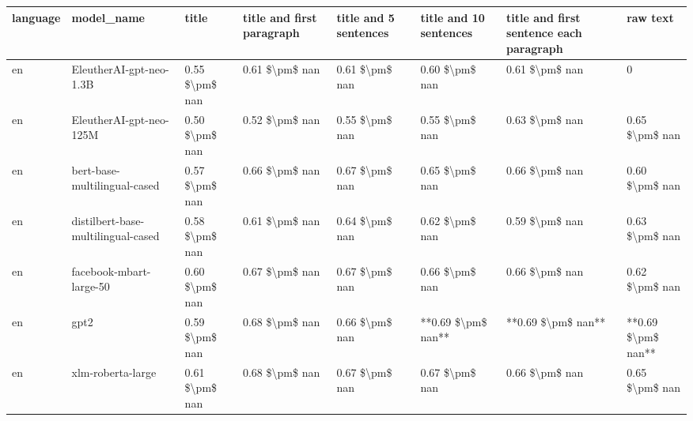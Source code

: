 \begin{tabular}{llllllll}
\toprule
language &                         model\_name &          title & title and first paragraph & title and 5 sentences & title and 10 sentences & title and first sentence each paragraph &           raw text \\
\midrule
      en &            EleutherAI-gpt-neo-1.3B & 0.55 \$\textbackslash pm\$ nan &            0.61 \$\textbackslash pm\$ nan &        0.61 \$\textbackslash pm\$ nan &         0.60 \$\textbackslash pm\$ nan &                          0.61 \$\textbackslash pm\$ nan &                  0 \\
      en &            EleutherAI-gpt-neo-125M & 0.50 \$\textbackslash pm\$ nan &            0.52 \$\textbackslash pm\$ nan &        0.55 \$\textbackslash pm\$ nan &         0.55 \$\textbackslash pm\$ nan &                          0.63 \$\textbackslash pm\$ nan &     0.65 \$\textbackslash pm\$ nan \\
      en &       bert-base-multilingual-cased & 0.57 \$\textbackslash pm\$ nan &            0.66 \$\textbackslash pm\$ nan &        0.67 \$\textbackslash pm\$ nan &         0.65 \$\textbackslash pm\$ nan &                          0.66 \$\textbackslash pm\$ nan &     0.60 \$\textbackslash pm\$ nan \\
      en & distilbert-base-multilingual-cased & 0.58 \$\textbackslash pm\$ nan &            0.61 \$\textbackslash pm\$ nan &        0.64 \$\textbackslash pm\$ nan &         0.62 \$\textbackslash pm\$ nan &                          0.59 \$\textbackslash pm\$ nan &     0.63 \$\textbackslash pm\$ nan \\
      en &            facebook-mbart-large-50 & 0.60 \$\textbackslash pm\$ nan &            0.67 \$\textbackslash pm\$ nan &        0.67 \$\textbackslash pm\$ nan &         0.66 \$\textbackslash pm\$ nan &                          0.66 \$\textbackslash pm\$ nan &     0.62 \$\textbackslash pm\$ nan \\
      en &                               gpt2 & 0.59 \$\textbackslash pm\$ nan &            0.68 \$\textbackslash pm\$ nan &        0.66 \$\textbackslash pm\$ nan &     **0.69 \$\textbackslash pm\$ nan** &                      **0.69 \$\textbackslash pm\$ nan** & **0.69 \$\textbackslash pm\$ nan** \\
      en &                  xlm-roberta-large & 0.61 \$\textbackslash pm\$ nan &            0.68 \$\textbackslash pm\$ nan &        0.67 \$\textbackslash pm\$ nan &         0.67 \$\textbackslash pm\$ nan &                          0.66 \$\textbackslash pm\$ nan &     0.65 \$\textbackslash pm\$ nan \\

\end{tabular}

